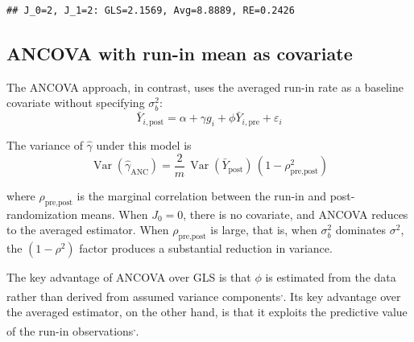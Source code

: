 \documentclass[
  11pt,
]{article}
\begin{document}
\begin{verbatim}
## J_0=2, J_1=2: GLS=2.1569, Avg=8.8889, RE=0.2426
\end{verbatim}

\subsection{ANCOVA with run-in mean as covariate}\label{ancova-with-run-in-mean-as-covariate}

The ANCOVA approach, in contrast, uses the averaged
run-in rate as a baseline covariate without specifying
\(\sigma_b^2\):
\begin{equation}
  \bar{Y}_{i,\text{post}} = \alpha + \gamma g_i
    + \phi \bar{Y}_{i,\text{pre}} + \varepsilon_i
\end{equation}

The variance of \(\hat\gamma\) under this model is
\begin{equation}
  \mathop{\mathrm{Var}}(\hat\gamma_{\text{ANC}})
  = \frac{2}{m}\,\mathop{\mathrm{Var}}(\bar{Y}_{\text{post}})
    \,(1 - \rho_{\text{pre,post}}^2)
\end{equation}

where \(\rho_{\text{pre,post}}\) is the marginal
correlation between the run-in and post-randomization
means. When \(J_0 = 0\), there is no covariate, and
ANCOVA reduces to the averaged estimator. When
\(\rho_{\text{pre,post}}\) is large, that is, when
\(\sigma_b^2\) dominates \(\sigma^2\), the \((1-\rho^2)\)
factor produces a substantial reduction in variance.

The key advantage of ANCOVA over GLS is that \(\phi\) is
estimated from the data rather than derived from
assumed variance components\textsuperscript{,}. Its
key advantage over the averaged estimator, on the other
hand, is that it exploits the predictive value of the
run-in observations\textsuperscript{,}.
\end{document}
